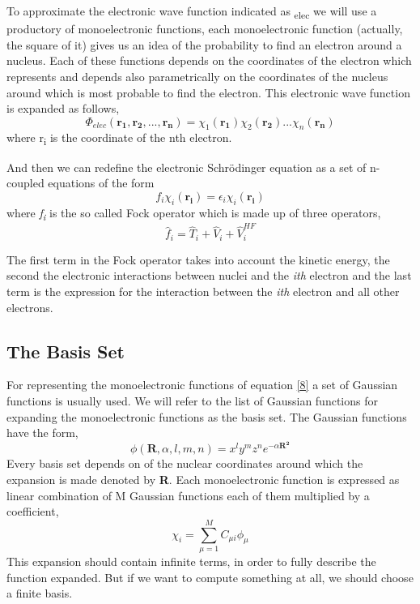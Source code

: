 \documentclass{tmr}
\begin{document}
\par To approximate the electronic wave function indicated as \textPhi\textsubscript{elec}
we will use a productory of monoelectronic functions, each monoelectronic
function (actually, the square of it) gives us an idea of the probability to find an electron around 
a nucleus. Each of these functions depends on the coordinates of the electron which represents and depends also 
parametrically on the coordinates of the nucleus around which is most probable to 
find the electron. This electronic wave function is expanded as follows, 
\begin{equation}\label{8}
 \Phi_{elec}(\mathbf{r_{1}},\mathbf{r_{2}},...,\mathbf{r_{n}}) =
 \chi_{1}(\mathbf{r_{1}})\chi_{2}(\mathbf{r_{2}})...\chi_{n}(\mathbf{r_{n}})
 \end{equation}                                                                                                                
where r\textsubscript{i} is the coordinate of the nth electron.

And then we can redefine the electronic Schr\"odinger equation as a set of n-coupled equations of 
the form 
\begin{equation}\label{9}
 f_{i}\chi_{i}(\mathbf{r_{i}}) = \epsilon_{i}\chi_{i}(\mathbf{r_{i}})
\end{equation}
where \textit{f\textsubscript{i}} is the so called Fock operator which is made up
of three operators, 
\begin{equation}\label{10}
\hat f_{i} = \hat T_{i}  + \hat V_{i} + \hat V^{HF}_{i} 
\end{equation}

The first term in the Fock operator takes into account the kinetic energy, the second
the electronic interactions between nuclei and the \textit{ith} electron and the last term
is the expression for the interaction between the \textit{ith} electron 
and all other electrons.

\subsection{The Basis Set}
For representing the monoelectronic functions of equation \eqref{8} a set of Gaussian 
functions is usually used. We will refer to the list of Gaussian functions for 
expanding the monoelectronic functions as the basis set. The Gaussian
functions have the form,
\begin{equation}\label{11}
\phi(\mathbf{R},\alpha,l,m,n) = x^{l}y^{m}z^{n} e^{-\alpha\mathbf{R^{2}}}
\end{equation}
Every basis set depends on of the nuclear coordinates around
which the expansion is made denoted by \textbf{R}. Each monoelectronic 
function is expressed as linear combination of M Gaussian 
functions each of them multiplied by a coefficient,
\begin{equation}\label{12}
\chi_{i} = \sum_{\mu = 1}^{M} C_{\mu i} \phi_{\mu}
\end{equation}
This expansion should contain infinite terms, in order to 
fully describe the function expanded. But if we
want to compute something at all, we should choose a finite basis.
\end{document}
